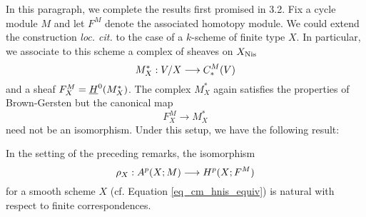 In this paragraph, we complete the results first promised in 3.2.
Fix a cycle module $M$ and let $F^M$ denote the associated 
homotopy module. We could extend the construction \emph{loc. cit.}
to the case of a $k$-scheme of finite type $X$. In particular, we 
associate to this scheme a complex of sheaves on $X_{\mathrm{Nis}}$
\[
M^*_X: V/X \longrightarrow C_*^{M}(V)
\]
and a sheaf $F^M_X = \underline{H}^0(M^*_X)$. The complex $M^*_X$ 
again satisfies the properties of Brown-Gersten but the canonical
map
\[
F^M_X \to M^*_X
\]
need not be an isomorphism. Under this setup, we have the 
following result:
\begin{prop}\label{prop_3_10}
In the setting of the preceding remarks, the isomorphism
\[
\rho_X: A^p(X; M) \longrightarrow H^p(X; F^M)
\]
for a smooth scheme $X$ (cf. Equation \ref{eq_cm_hnis_equiv}) is 
natural with respect to finite correspondences.
\end{prop}
